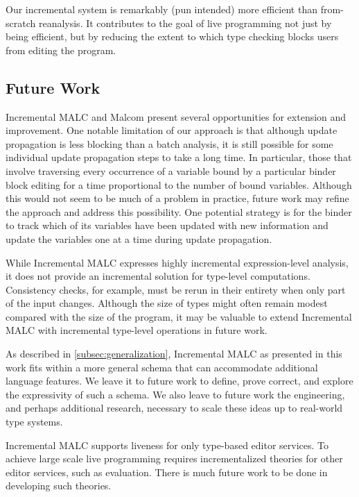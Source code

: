 \documentclass[acmsmall,dvipsnames,10pt,nonacm]{acmart}\settopmatter{printfolios=true} %
\providecommand{\DIFaddbegin}{} %
\providecommand{\DIFaddend}{} %
\providecommand{\DIFdelbegin}{} %
\providecommand{\DIFdelend}{} %
\newcommand{\DIFscaledelfig}{0.5}
\newlength{\DIFdelgraphicswidth} %
\newlength{\DIFdelgraphicsheight} %
\newcommand{\DIFaddincludegraphics}[2][]{{\color{blue}\fbox{\DIFOincludegraphics[#1]{#2}}}} %
\newcommand{\DIFdelincludegraphics}[2][]{%
\sbox{\DIFdelgraphicsbox}{\DIFOincludegraphics[#1]{#2}}%
\settoboxwidth{\DIFdelgraphicswidth}{\DIFdelgraphicsbox} %
\settoboxtotalheight{\DIFdelgraphicsheight}{\DIFdelgraphicsbox} %
\scalebox{\DIFscaledelfig}{%
\parbox[b]{\DIFdelgraphicswidth}{\usebox{\DIFdelgraphicsbox}\\[-\baselineskip] \rule{\DIFdelgraphicswidth}{0em}}\llap{\resizebox{\DIFdelgraphicswidth}{\DIFdelgraphicsheight}{%
\setlength{\unitlength}{\DIFdelgraphicswidth}%
\begin{picture}(1,1)%
\thicklines\linethickness{2pt} %
{\color[rgb]{1,0,0}\put(0,0){\framebox(1,1){}}}%
{\color[rgb]{1,0,0}\put(0,0){\line( 1,1){1}}}%
{\color[rgb]{1,0,0}\put(0,1){\line(1,-1){1}}}%
\end{picture}%
}\hspace*{3pt}}} %
} %
\DeclareRobustCommand{\DIFaddbegin}{\DIFOaddbegin \let\includegraphics\DIFaddincludegraphics} %
\DeclareRobustCommand{\DIFaddend}{\DIFOaddend \let\includegraphics\DIFOincludegraphics} %
\DeclareRobustCommand{\DIFdelbegin}{\DIFOdelbegin \let\includegraphics\DIFdelincludegraphics} %
\DeclareRobustCommand{\DIFdelend}{\DIFOaddend \let\includegraphics\DIFOincludegraphics} %
\begin{document}
Our incremental system is remarkably (pun intended) more efficient than from-scratch reanalysis. It contributes to the goal of live programming not just by being efficient, but by reducing the extent to which type checking blocks users from editing the program. 


\subsection{Future Work}
Incremental MALC and Malcom present several opportunities for extension and improvement. One notable limitation of our approach is that although update propagation is less blocking than a batch analysis, it is still possible for some individual update propagation steps to take a long time. In particular, those that involve traversing every occurrence of a variable bound by a particular binder block editing for a time proportional to the number of bound variables. Although this would not seem to be much of a problem in practice, future work may refine the approach and address this possibility. One potential strategy is for the binder to track which of its variables have been updated with new information and update the variables one at a time during update propagation.

While Incremental MALC expresses highly incremental expression-level analysis, it does not provide an incremental solution for type-level computations. Consistency checks, for example, must be rerun in their entirety when only part of the input changes. Although the size of types might often remain modest compared with the size of the program, it may be valuable to extend Incremental MALC with incremental type-level operations in future work. 

As described in \DIFdelbegin %
\DIFdelend \DIFaddbegin \autoref{subsec:generalization}\DIFaddend , Incremental MALC as presented in this work fits within a more general schema that can accommodate additional language features. We leave it to future work to define, prove correct, and explore the expressivity of such a schema. We also leave to future work the engineering, and perhaps additional research, necessary to scale these ideas up to real-world type systems. 

Incremental MALC supports liveness for only type-based editor services. To achieve large scale live programming requires incrementalized theories for other editor services, such as evaluation. There is much future work to be done in developing such theories. 
\end{document}

